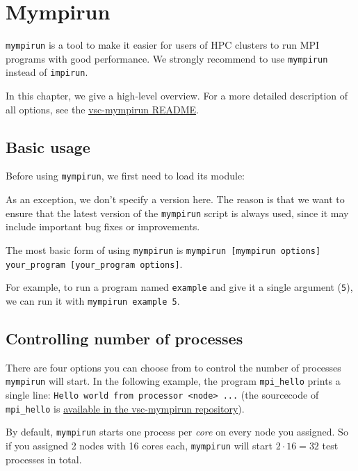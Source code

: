 \chapter{Mympirun}
\label{ch:mympirun}

\lstinline|mympirun| is a tool to make it easier for users of HPC clusters to run
MPI programs with good performance. We strongly recommend to use \lstinline|mympirun|
instead of \lstinline|impirun|.

In this chapter, we give a high-level overview. For a more detailed description of all
options, see the
\href{https://github.com/hpcugent/vsc-mympirun/blob/master/README.md}{vsc-mympirun README}.

\section{Basic usage}
\label{sec:myrun-basic-usage}

Before using \lstinline|mympirun|, we first need to load its module:

\begin{prompt}
\end{prompt}

As an exception, we don't specify a version here. The reason is that we want to ensure
that the latest version of the \lstinline|mympirun| script is always used, since it may
include important bug fixes or improvements.

The most basic form of using \lstinline|mympirun| is \lstinline|mympirun [mympirun options] your_program [your_program options]|.

For example, to run a program named \lstinline|example| and give it a single argument (\lstinline|5|),
we can run it with \lstinline|mympirun example 5|.


\section{Controlling number of processes}

There are four options you can choose from to control the number of processes
\lstinline|mympirun| will start. In the following example, the program \lstinline|mpi_hello|
prints a single line: \lstinline|Hello world from processor <node> ...| (the sourcecode of
\lstinline|mpi_hello| is \href{https://github.com/hpcugent/vsc-mympirun/blob/master/testscripts/mpi_helloworld.c}{available in the vsc-mympirun repository}).

By default, \lstinline|mympirun| starts one process per \emph{core} on every node you assigned.
So if you assigned 2 nodes with 16 cores each, \lstinline|mympirun| will
start $2\cdot16=32$ test processes in total.

